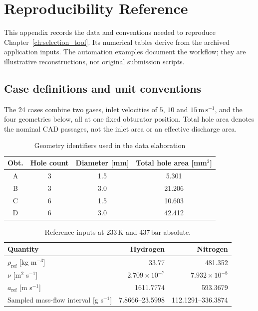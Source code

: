 \chapter{Reproducibility Reference}
\label{ch:appendix_codes}

This appendix records the data and conventions needed to reproduce Chapter~\ref{ch:selection_tool}. Its numerical tables derive from the archived application inputs. The automation examples document the workflow; they are illustrative reconstructions, not original submission scripts.

\section{Case definitions and unit conventions}
\label{sec:app_case_catalogue}

The 24 cases combine two gases, inlet velocities of $5$, $10$ and $15\,\mathrm{m\,s^{-1}}$, and the four geometries below, all at one fixed obturator position. Total hole area denotes the nominal CAD passages, not the inlet area or an effective discharge area.

\begin{table}[H]
\centering
\begin{tabular}{@{}cccc@{}}
\toprule
Obt. & Hole count & Diameter [mm] & Total hole area [mm$^2$]\\
\midrule
A & 3 & 1.5 & 5.301\\
B & 3 & 3.0 & 21.206\\
C & 6 & 1.5 & 10.603\\
D & 6 & 3.0 & 42.412\\
\bottomrule
\end{tabular}
\caption{Geometry identifiers used in the data elaboration}
\label{tab:app_geometries}
\end{table}

\begin{table}[H]
\centering\small
\begin{tabular}{@{}lrr@{}}
\toprule
Quantity & Hydrogen & Nitrogen\\
\midrule
$\rho_{\mathrm{ref}}$ [kg m$^{-3}$] & 33.77 & 481.352\\
$\nu$ [m$^2$ s$^{-1}$] & $2.709\times10^{-7}$ & $7.932\times10^{-8}$\\
$a_{\mathrm{ref}}$ [m s$^{-1}$] & 1611.7774 & 593.3679\\
Sampled mass-flow interval [g s$^{-1}$] & 7.8666--23.5998 & 112.1291--336.3874\\
\bottomrule
\end{tabular}
\caption{Reference inputs at $233\,\mathrm{K}$ and $437\,\mathrm{bar}$ absolute.}
\label{tab:app_properties}
\end{table}

